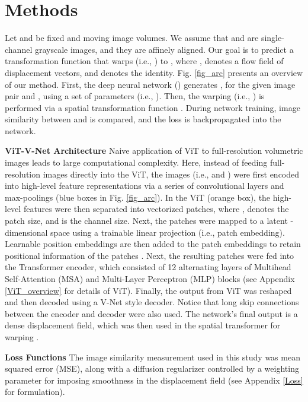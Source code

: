 \documentclass{midl}
\begin{document}
\vspace{-5mm}
\section{Methods}
\vspace{-1mm}
Let  and  be fixed and moving image volumes. We assume that  and  are single-channel grayscale images, and they are affinely aligned. Our goal is to predict a transformation function  that warps  (i.e., ) to , where ,  denotes a flow field of displacement vectors, and  denotes the identity. Fig. \ref{fig_arc} presents an overview of our method. First, the deep neural network () generates , for the given image pair  and , using a set of parameters  (i.e., ). Then, the warping (i.e., ) is performed via a spatial transformation function \cite{jaderberg2015spatial}. During network training, image similarity between  and  is compared, and the loss is backpropagated into the network.

\noindent\textbf{ViT-V-Net Architecture} 
Naive application of ViT to full-resolution volumetric images leads to large computational complexity. Here, instead of feeding full-resolution images directly into the ViT, the images (i.e.,  and ) were first encoded into high-level feature representations via a series of convolutional layers and max-poolings (blue boxes in Fig. \ref{fig_arc}). In the ViT (orange box), the high-level features were then separated into  vectorized  patches, where ,  denotes the patch size, and  is the channel size. Next, the patches were mapped to a latent -dimensional space using a trainable linear projection (i.e., patch embedding). Learnable position embeddings are then added to the patch embeddings to retain positional information of the patches \cite{dosovitskiy2020image}. Next, the resulting patches were fed into the Transformer encoder, which consisted of 12 alternating layers of Multihead Self-Attention (MSA) and Multi-Layer Perceptron (MLP) blocks \cite{vaswani2017attention} (see Appendix \ref{ViT_overview} for details of ViT). Finally, the output from ViT was reshaped and then decoded using a V-Net style decoder. Notice that long skip connections between the encoder and decoder were also used. The network's final output is a dense displacement field, which was then used in the spatial transformer for warping .

\noindent\textbf{Loss Functions} 
The image similarity measurement used in this study was mean squared error (MSE), along with a diffusion regularizer controlled by a weighting parameter  for imposing smoothness in the displacement field  (see Appendix \ref{Loss} for formulation).
\end{document}
